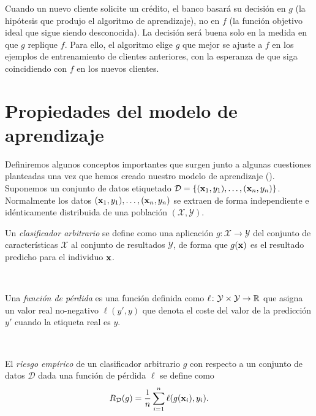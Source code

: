\documentclass[oneside,openright,titlepage,numbers=noenddot,openany,headinclude,footinclude=true,
cleardoublepage=empty,abstractoff,BCOR=5mm,paper=a4,fontsize=12pt,main=spanish]{scrreprt}
\begin{document}
\clearpage

Cuando un nuevo cliente solicite un crédito, el banco basará su decisión en $g$ (la hipótesis que produjo el algoritmo de aprendizaje), no en $f$ (la
función objetivo ideal que sigue siendo desconocida). La decisión será buena solo en la medida en que $g$ replique $f$. Para ello, el algoritmo elige $g$ que mejor se ajuste a $f$ en los ejemplos de entrenamiento de clientes anteriores, con la esperanza de que siga coincidiendo con $f$ en los nuevos clientes.

\section{Propiedades del modelo de aprendizaje}

Definiremos algunos conceptos importantes que surgen junto a algunas cuestiones planteadas una vez que hemos creado nuestro modelo de aprendizaje (\cite{fairnesslearning2019}). Suponemos un conjunto de datos etiquetado $\mathcal{D}=\{(\textbf{x}_1,y_1),\dots,(\textbf{x}_n,y_n)\}$. Normalmente los datos $(\textbf{x}_1, y_1),\dots, (\textbf{x}_n, y_n)$ se extraen de forma independiente e idénticamente distribuida de una población $(\mathcal{X},\mathcal{Y})$.\\

\begin{definition}
Un \textit{clasificador arbitrario} se define como una aplicación $g\colon \mathcal{X} \to \mathcal{Y}$ del conjunto de características $\mathcal{X}$ al conjunto de resultados $\mathcal{Y}$, de forma que $ g(\textbf{x})$ es el resultado predicho para el individuo $\textbf{x}$.
\end{definition}\

\begin{definition}
Una \textit{función de pérdida} es una función definida como $\ell \colon \mathcal{Y} \times \mathcal{Y} \to \mathbb{R}$ que asigna un valor real no-negativo $\ell(y',y)$ que denota el coste del valor de la predicción $y'$ cuando la etiqueta real es $y$.
\end{definition}\

\begin{definition}
El \textit{riesgo empírico} de un clasificador arbitrario $g$ con respecto a un conjunto de datos $\mathcal{D}$ dada una función de pérdida $\ell$ se define como $$R_{\mathcal{D}}(g)=\frac{1}{n}\sum_{i=1}^n \ell(g(\textbf{x}_i),y_i).$$
\end{definition}\
\end{document}
